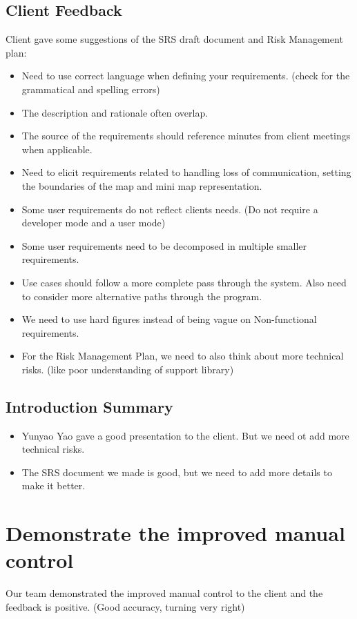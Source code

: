\documentclass[11pt, a4paper]{article}
\begin{document}
\subsection{Client Feedback}
Client gave some suggestions of the SRS draft document and Risk Management plan:
\begin{itemize}
\item Need to use correct language when defining your requirements. (check for the grammatical and spelling errors)
\item The description and rationale often overlap.
\item The source of the requirements should reference minutes from client meetings when applicable.
\item Need to elicit requirements related to handling loss of communication, setting the boundaries of the map and mini map representation.
\item Some user requirements do not reflect clients needs. (Do not require a developer mode and a user mode)
\item Some user requirements need to be decomposed in multiple smaller requirements.
\item Use cases should follow a more complete pass through the system. Also need to consider more alternative paths through the program.
\item We need to use hard figures instead of being vague on Non-functional requirements.
\item For the Risk Management Plan, we need to also think about more technical risks. (like poor understanding of support library)
\end{itemize}

\subsection{Introduction Summary}
\begin{itemize}
\item  Yunyao Yao gave a good presentation to the client. But we need ot add more technical risks. 
\item The SRS document we made is good, but we need to add more details to make it better.
\end{itemize}


\section{Demonstrate the improved manual control}
Our team demonstrated the improved manual control to the client and the feedback is positive. (Good accuracy, turning very right)
\end{document}

